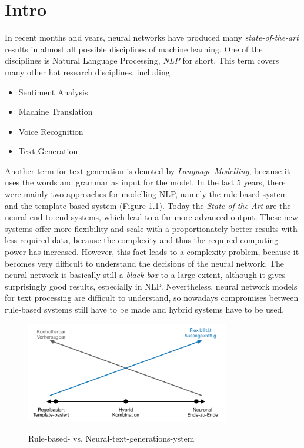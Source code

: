 \chapter{Intro}\label{ch:intro}

In recent months and years, neural networks have produced many \textit{state-of-the-art} results in almost all possible disciplines of machine learning. One of the disciplines is Natural Language Processing, \textit{NLP} for short. This term covers many other hot research disciplines, including 

\begin{itemize}
\item Sentiment Analysis
\item Machine Translation
\item Voice Recognition
\item Text Generation
\end{itemize}

Another term for text generation is denoted by \textit{Language Modelling}, because it uses the words and grammar as input for the model. In the last 5 years, there were mainly two approaches for modelling NLP, namely the rule-based system and the template-based system (Figure \ref{rules_based}). Today the \textit{State-of-the-Art} are the neural end-to-end systems, which lead to a far more advanced output. These new systems offer more flexibility and scale with a proportionately better results with less required data, because the complexity and thus the required computing power has increased. However, this fact leads to a complexity problem, because it becomes very difficult to understand the decisions of the neural network. The neural network is basically still a \textit{black box} to a large extent, although it gives surprisingly good results, especially in NLP. Nevertheless, neural network models for text processing are difficult to understand, so nowadays compromises between rule-based systems still have to be made and hybrid systems have to be used. 

\begin{figure}
  \begin{center}
  \includegraphics[width=3.5in]{photos/regel_basiert}\\
  \caption{Rule-based- vs. Neural-text-generations-ystem}\label{rules_based}
  \end{center}
\end{figure}

